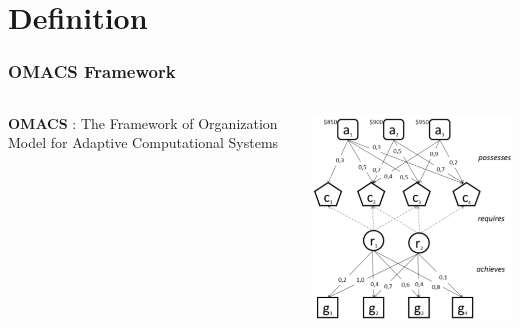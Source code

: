 \documentclass[12pt]{beamer}
\begin{document}
\section{Definition} 

\begin{frame}
\frametitle{OMACS Framework} 

\begin{columns}
	

	 \begin{center}\textbf{OMACS} :
	The Framework of Organization Model for Adaptive Computational  Systems
	\end{center}
	\includegraphics[scale=0.4]{omacs.png}
	
\end{columns}

\end{frame}
\end{document}
